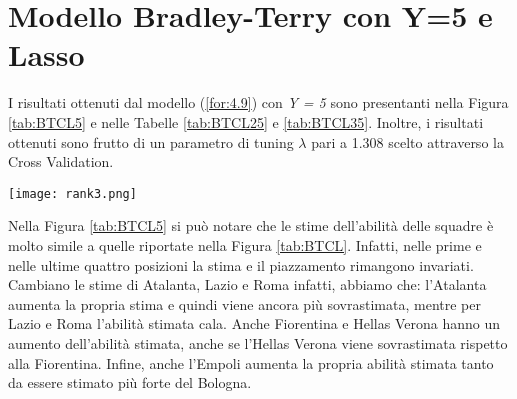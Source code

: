 \section{Modello Bradley-Terry con Y=5 e Lasso}
I risultati ottenuti dal modello (\ref{for:4.9}) con \emph{Y = 5} sono presentanti nella Figura \ref{tab:BTCL5} e nelle Tabelle \ref{tab:BTCL25} e \ref{tab:BTCL35}. Inoltre, i risultati ottenuti sono frutto di un parametro di tuning $\lambda$ pari a 1.308 scelto attraverso la Cross Validation.
\begin{sidewaysfigure} 
	\centering
	\begin{center}
		\texttt{[image: rank3.png]}
		\caption{Barplot che indica per ogni squadra l'abilità stimata dal modello (\ref{for:4.9}) con \emph{Y = 5}. Viene indicato con un asterisco le squadre con un piazzamento stimato diverso da quello reale anche esso riportato a destra del grafico.} \label{tab:BTCL5} 
	\end{center}
\end{sidewaysfigure}
Nella Figura \ref{tab:BTCL5} si può notare che le stime dell'abilità delle squadre è molto simile a quelle riportate nella Figura \ref{tab:BTCL}. Infatti, nelle prime e nelle ultime quattro posizioni la stima e il piazzamento rimangono invariati. Cambiano le stime di Atalanta, Lazio e Roma infatti, abbiamo che: l'Atalanta aumenta la propria stima e quindi viene ancora più sovrastimata, mentre per Lazio e Roma l'abilità stimata cala. Anche Fiorentina e Hellas Verona hanno un aumento dell'abilità stimata, anche se l'Hellas Verona viene sovrastimata rispetto alla Fiorentina. Infine, anche l'Empoli aumenta la propria abilità stimata tanto da essere stimato più forte del Bologna.\\
